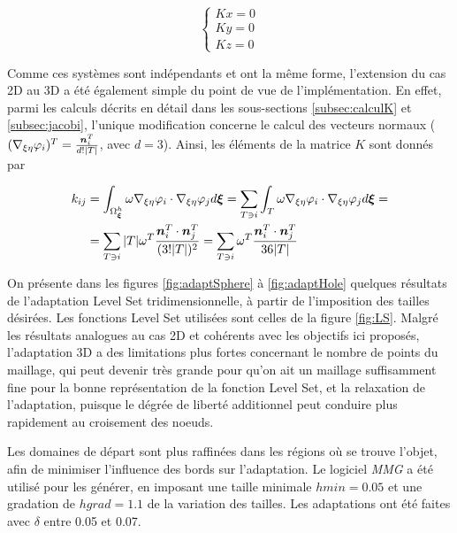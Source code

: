 \begin{equation*}
	\begin{cases}
		Kx = 0 \\
		Ky = 0 \\
		Kz = 0
	\end{cases}
\end{equation*}

\indent Comme ces systèmes sont indépendants et ont la même forme, l'extension du cas 2D au 3D a été également simple du point de vue de l'implémentation. En effet, parmi les calculs décrits en détail dans les sous-sections \ref{subsec:calculK} et \ref{subsec:jacobi}, l'unique modification concerne le calcul des vecteurs normaux (\((\nabla_{\xi\eta} \varphi_i)^T = \frac{\boldsymbol{n}_i^T}{d\text{!}|T|}\), avec \(d=3\)). Ainsi, les éléments de la matrice \(K\) sont donnés par


\begin{equation*}
\begin{gathered}
\begin{aligned}
	k_{ij} & = \int_{\Omega_{\boldsymbol{\xi}}^h}{ \omega \nabla_{\xi\eta} \varphi_i  \cdot \nabla_{\xi\eta} \varphi_j  d\boldsymbol{\xi}} = \sum_{T \ni i} {\int_{T}{ \omega \nabla_{\xi\eta} \varphi_i \cdot \nabla_{\xi\eta} \varphi_j  d\boldsymbol{\xi}}} = \\
	       &  = \sum_{T \ni i}
	              { 
	                     { |T|\omega^T \frac{\boldsymbol{n}_i^T\cdot \boldsymbol{n}_j^T}{(3\text{!}|T|)^2}
	                     }
	              }
	          = \sum_{T \ni i}
	              { 
	                     { \omega^T \frac{\boldsymbol{n}_i^T\cdot \boldsymbol{n}_j^T}{36|T|}
	                     }
	              }	              
\end{aligned}
\end{gathered}
\end{equation*}

\indent On présente dans les figures \ref{fig:adaptSphere} à \ref{fig:adaptHole} quelques résultats de l'adaptation Level Set tridimensionnelle, à partir de l'imposition des tailles désirées. Les fonctions Level Set utilisées sont celles de la figure \ref{fig:LS}. Malgré les résultats analogues au cas 2D et cohérents avec les objectifs ici proposés, l'adaptation 3D a des limitations plus fortes concernant le nombre de points du maillage, qui peut devenir très grande pour qu'on ait un maillage suffisamment fine pour la bonne représentation de la fonction Level Set, et la relaxation de l'adaptation, puisque le dégrée de liberté additionnel peut conduire plus rapidement au croisement des noeuds.

\indent Les domaines de départ sont plus raffinées dans les régions où se trouve l'objet, afin de minimiser l'influence des bords sur l'adaptation. Le logiciel \emph{MMG} a été utilisé pour les générer, en imposant une taille minimale \(hmin =  0.05\) et une gradation de \(hgrad = 1.1\) de la variation des tailles. Les adaptations ont été faites avec \(\delta\) entre 0.05 et 0.07.


